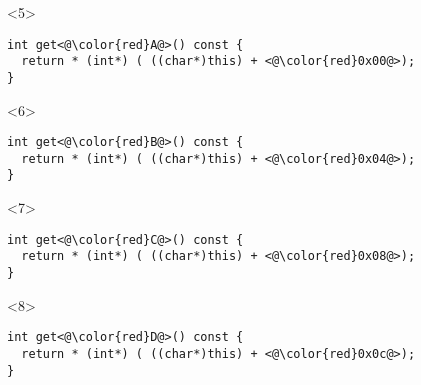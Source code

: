 \begin{frame}[fragile]
\begin{overlayarea}{\textwidth}{3cm}
\begin{threecols}
\end{threecols}
\end{overlayarea}


\begin{overlayarea}{\textwidth}{3cm}
\begin{onlyenv}<5>
\begin{yesblock}
\begin{lstlisting}
int get<@\color{red}A@>() const {
  return * (int*) ( ((char*)this) + <@\color{red}0x00@>);
}
\end{lstlisting}
\end{yesblock}
\end{onlyenv}

\begin{onlyenv}<6>
\begin{yesblock}
\begin{lstlisting}
int get<@\color{red}B@>() const {
  return * (int*) ( ((char*)this) + <@\color{red}0x04@>);
}
\end{lstlisting}
\end{yesblock}
\end{onlyenv}

\begin{onlyenv}<7>
\begin{yesblock}
\begin{lstlisting}
int get<@\color{red}C@>() const {
  return * (int*) ( ((char*)this) + <@\color{red}0x08@>);
}
\end{lstlisting}
\end{yesblock}
\end{onlyenv}

\begin{onlyenv}<8>
\begin{yesblock}
\begin{lstlisting}
int get<@\color{red}D@>() const {
  return * (int*) ( ((char*)this) + <@\color{red}0x0c@>);
}
\end{lstlisting}
\end{yesblock}
\end{onlyenv}
\end{overlayarea}

\end{frame}




\begin{frame}[fragile]
\end{frame}





